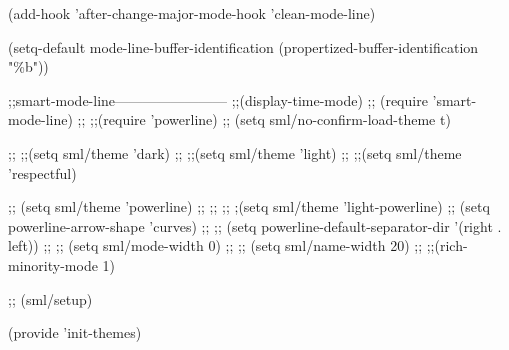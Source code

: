 \documentclass[presentation]{beamer}
\begin{document}
(add-hook 'after-change-major-mode-hook 'clean-mode-line)


(setq-default mode-line-buffer-identification
	      (propertized-buffer-identification "\%b"))


;;smart-mode-line------------------------
;;(display-time-mode)
;; (require 'smart-mode-line)
;; ;;(require 'powerline)
;; (setq sml/no-confirm-load-theme t)

;; ;;(setq sml/theme 'dark)
;; ;;(setq sml/theme 'light)
;; ;;(setq sml/theme 'respectful)

;; (setq sml/theme 'powerline)
;; ;; ;; ;(setq sml/theme 'light-powerline)
;; (setq powerline-arrow-shape 'curves)
;; ;; (setq powerline-default-separator-dir '(right . left))
;; ;; (setq sml/mode-width 0)
;; ;; (setq sml/name-width 20)
;; ;;(rich-minority-mode 1)

;; (sml/setup)

(provide 'init-themes)
\end{document}
